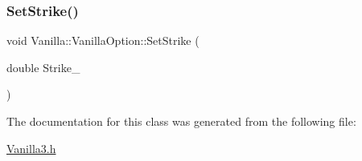 \subsubsection{\texorpdfstring{Set\+Strike()}{SetStrike()}}
{\footnotesize\ttfamily void Vanilla\+::\+Vanilla\+Option\+::\+Set\+Strike (\begin{DoxyParamCaption}\item[{double}]{Strike\+\_\+ }\end{DoxyParamCaption})}



The documentation for this class was generated from the following file\+:\begin{DoxyCompactItemize}
\item 
\hyperlink{Vanilla3_8h}{Vanilla3.\+h}\end{DoxyCompactItemize}

